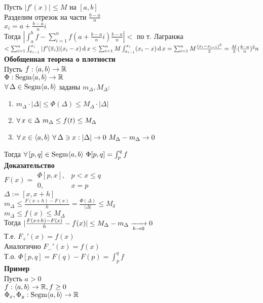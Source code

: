 \documentclass[12pt]{article}
\begin{document}
Пусть $|f'(x)| \leq M$ на $[a,b]$\\
Разделим отрезок на части $\frac{b-a}n$\\
$x_i = a + \frac{b-a}ni$\\
Тогда $|\int_a^b f - \sum_{i=1}^n f(a+\frac{b-a}ni)\frac{b-a}n| < $ по т. Лагранжа $ < \sum_{i=1}^n \int_{x_{i-1}}^{x_i} |f'(\overline x_i)|(x_i-x) \operatorname{d} x \leq \sum_{i=1}^n M\int_{x_{i-1}}^{x_i} (x_i-x)\operatorname{d} x = \sum_{i=1}^n M\frac{(x_i-x_{i-1})^2}2 = \frac M2 (\frac{b-a}n)^2 n$\\
\textbf{Обобщенная теорема о плотности}\\
Пусть $f: \langle a, b \rangle \rightarrow \mathbb{R}$\\
$\Phi: \operatorname{Segm}\langle a, b \rangle \rightarrow \mathbb{R}$\\
$\forall\, \Delta \in \operatorname{Segm}\langle a, b \rangle$ заданы $m_\Delta, M_\Delta:$
\begin{enumerate}
    \item $m_\Delta\cdot|\Delta| \leq \Phi(\Delta) \leq M_\Delta\cdot|\Delta|$
    \item $\forall\, x \in \Delta\ m_\Delta \leq f(t) \leq M_\Delta$
    \item $\forall\, x \in \langle a, b \rangle\ \forall\, \Delta \ni x: |\Delta| \rightarrow 0\ M_\Delta-m_\Delta \rightarrow 0$\\
\end{enumerate}
Тогда $\fall [p,q] \in \nm{Segm}\an ab\ \Phi[p,q] = \int_p^q f$\\
\textbf{Доказательство}\\
$F(x) = \left.\begin{array}{ll}
   \Phi[p,x],  & p < x \leq q \\
    0, & x=p
\end{array}\right.$\\
$\Delta := [x,x+h]$\\
$m_\Delta \leq \frac{F(x+h)-F(x)}{h} = \frac{\Phi(\Delta)}{|\Delta|} \leq M_\delta$\\
$m_\Delta \leq f(x) \leq M_\Delta$\\
Тогда $| \frac{F(x+h)-F(x)}h - f(x)| \leq M_\Delta - m_\Delta \xrightarrow[h\rightarrow 0]{} 0$\\
Т.е. $F_+'(x) = f(x)$\\
Аналогично $F_-'(x) = f(x)$\\
Т.о. $\Phi[p,q] = F(q)-F(p) = \int_p^q f$\\
\textbf{Пример}\\
Пусть $a > 0$\\
$f: \langle a, b \rangle \rightarrow \mathbb{R}, f \geq 0$\\
$\Phi_x, \Phi_y: \operatorname{Segm}\langle a, b \rangle \rightarrow \mathbb{R}$\\
\end{document}
